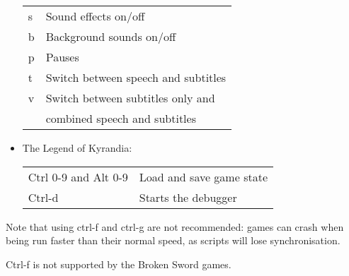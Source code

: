 \begin{itemize}
\begin{tabular}{ll}
    s                      & Sound effects on/off\\
    b                      & Background sounds on/off\\
    p                      & Pauses\\
    t                      & Switch between speech and subtitles\\
    v                      & Switch between subtitles only and\\
                           & combined speech and subtitles\\
  \end{tabular}
\item The Legend of Kyrandia:\\
  \begin{tabular}{ll}
    Ctrl 0-9 and Alt 0-9   & Load and save game state\\
    Ctrl-d                 & Starts the debugger\\
  \end{tabular}
\end{itemize}

Note that using ctrl-f and ctrl-g are not recommended: games can crash when
being run faster than their normal speed, as scripts will lose synchronisation.

Ctrl-f is not supported by the Broken Sword games.


